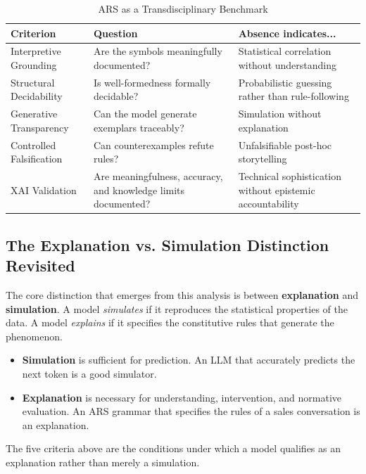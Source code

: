 \documentclass[12pt,a4paper]{article}
\begin{document}
\begin{table}[H]
\centering
\caption{ARS as a Transdisciplinary Benchmark}
\label{tab:benchmark}
\begin{tabular}{@{} p{3cm} p{4cm} p{6cm} @{}}
\toprule
\textbf{Criterion} & \textbf{Question} & \textbf{Absence indicates...} \\
\midrule
Interpretive Grounding & Are the symbols meaningfully documented? & Statistical correlation without understanding \\
Structural Decidability & Is well-formedness formally decidable? & Probabilistic guessing rather than rule-following \\
Generative Transparency & Can the model generate exemplars traceably? & Simulation without explanation \\
Controlled Falsification & Can counterexamples refute rules? & Unfalsifiable post-hoc storytelling \\
XAI Validation & Are meaningfulness, accuracy, and knowledge limits documented? & Technical sophistication without epistemic accountability \\
\bottomrule
\end{tabular}
\end{table}

\subsection{The Explanation vs. Simulation Distinction Revisited}

The core distinction that emerges from this analysis is between 
\textbf{explanation} and \textbf{simulation}. A model \textit{simulates} 
if it reproduces the statistical properties of the data. A model 
\textit{explains} if it specifies the constitutive rules that generate 
the phenomenon.

\begin{itemize}
    \item \textbf{Simulation} is sufficient for prediction. An LLM that 
    accurately predicts the next token is a good simulator.
    \item \textbf{Explanation} is necessary for understanding, intervention, 
    and normative evaluation. An ARS grammar that specifies the rules of 
    a sales conversation is an explanation.
\end{itemize}

The five criteria above are the conditions under which a model qualifies 
as an explanation rather than merely a simulation.
\end{document}
